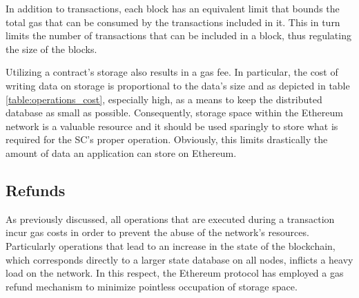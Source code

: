 In addition to transactions, each block has an equivalent limit that bounds the total gas that can be consumed by the transactions included in it. This in turn limits the number of transactions that can be included in a block, thus regulating the size of the blocks.

Utilizing a contract’s storage also results in a gas fee. In particular, the cost of writing data on storage is proportional to the data’s size and as depicted in table \ref{table:operations_cost}, especially high, as a means to keep the distributed database as small as possible. Consequently, storage space within the Ethereum network is a valuable resource and it should be used sparingly to store what is required for the SC's proper operation. Obviously, this limits drastically the amount of data an application can store on Ethereum.

\subsection{Refunds}\label{sec:gas}
As previously discussed, all operations that are executed during a transaction incur gas costs in order to prevent the abuse of the network's resources. Particularly operations that lead to an increase in the state of the blockchain, which corresponds directly to a larger state database on all nodes, inflicts a heavy load on the network. In this respect, the Ethereum protocol has employed a gas refund mechanism to minimize pointless occupation of storage space.

